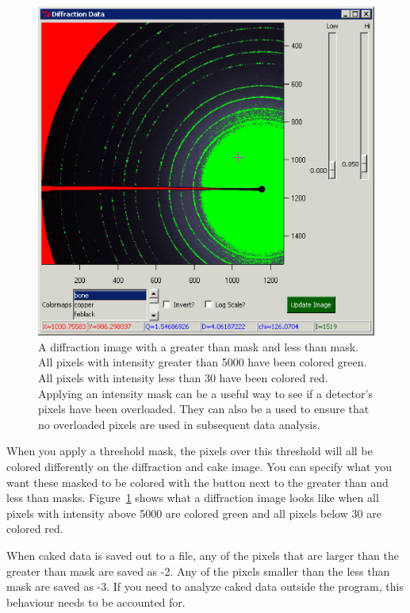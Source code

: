 \begin{figure}
    \centering
    \includegraphics[scale=.75]{figures/Threshold_Masking.eps}
    \caption{A diffraction image with a
    greater than mask and less than mask.
    All pixels with intensity greater than 5000 
    have been colored green. All pixels with 
    intensity less than 30 have been colored red. Applying
    an intensity mask can be a useful way to see if a detector's
    pixels have been overloaded. They can also be a used to
    ensure that no overloaded pixels are used in subsequent
    data analysis.}
    \label{Threshold_Masking}
\end{figure}

When you apply a threshold mask, the pixels over this threshold 
will all be colored differently on the diffraction and cake image. 
You can specify what you want these masked to be colored 
with the  button next to the greater 
than and less than masks. Figure~\ref{Threshold_Masking} shows 
what a diffraction image looks like when all pixels
with intensity above 5000 are colored green and all pixels 
below 30 are colored red.

When caked data is saved out to a file, any of the pixels 
that are larger than the greater than mask are saved 
as -2. Any of the pixels smaller than the less than mask
are saved as -3.  If you need to analyze caked data outside 
the program, this behaviour needs to be accounted for.

